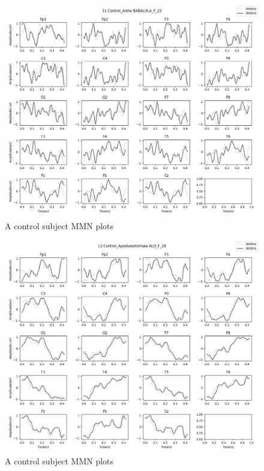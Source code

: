 \documentclass[10pt]{article}
\begin{document}
\begin{figure}[H]
  \includegraphics[width=16cm]{../../../data_analysis_results/MMN/time_series/Control/11.png}
  \caption{A control subject MMN plots}
\end{figure}
\begin{figure}[H]
  \includegraphics[width=16cm]{../../../data_analysis_results/MMN/time_series/Control/12.png}
  \caption{A control subject MMN plots}
\end{figure}
\end{document}
